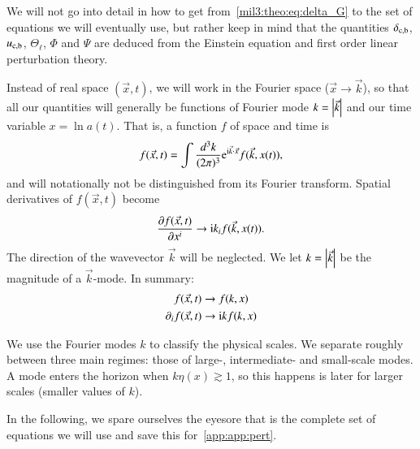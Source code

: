 We will not go into detail in how to get from~\cref{mil3:theo:eq:delta_G} to the set of equations we will eventually use, but rather keep in mind that the quantities $\delta_\mathrm{c,b}$, $u_\mathrm{c,b}$, $\Theta_\ell$, $\Phi$ and $\Psi$ are deduced from the Einstein equation and first order linear perturbation theory. 


Instead of real space $(\vec{x}, t)$, we will work in the Fourier space ($\vec{x}\to\vec{k}$), so that all our quantities will generally be functions of Fourier mode $k=\abs{\vec{k}}$ and our time variable $x = \ln{a(t)}$. That is, a function $f$ of space and time is
\begin{equation}
    f(\vec{x}, t) = \int \frac{d^3 k}{(2\pi)^3} \eu^{\im \vec{k}\cdot \vec{x}}f(\vec{k}, x(t)),
\end{equation}
and will notationally not be distinguished from its Fourier transform. Spatial derivatives of $f(\vec{x}, t)$ become
\begin{equation}
    \pdv{f(\vec{x}, t)}{x^i} \to \mathrm{i} k_i f(\vec{k}, x(t)).
\end{equation}
The direction of the wavevector $\vec{k}$ will be neglected. We let $k=\abs{\vec{k}}$ be the magnitude of a $\vec{k}$-mode. In summary:
\begin{equation}
\begin{split}
    f(\vec{x}, t) &\to f(k, x) \\
    \partial_i f(\vec{x}, t) &\to \mathrm{i} k f(k, x)
\end{split}
\end{equation}

We use the Fourier modes $k$ to classify the physical scales. We separate roughly between three main regimes: those of large-, intermediate- and small-scale modes. A mode enters the horizon when $k\eta(x) \gtrsim 1$, so this happens is later for larger scales (smaller values of $k$).

In the following, we spare ourselves the eyesore that is the complete set of equations we will use and save this for~\cref{app:app:pert}.





